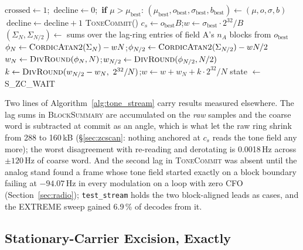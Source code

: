 \begin{algorithm}[H]
\begin{algorithmic}[1]
 
    \State $\mathrm{crossed} \gets 1$;\ $\mathrm{decline} \gets 0$;\ \textbf{if} $\mu > \mu_{\mathrm{best}}$: $(\mu_{\mathrm{best}}, o_{\mathrm{best}}, \sigma_{\mathrm{best}}, b_{\mathrm{best}}) \gets (\mu, o, \sigma, b)$
 $\ \mathrm{decline} \gets \mathrm{decline} + 1$
\EndIf
{}
    \State \textsc{ToneCommit}()
\EndIf
\Statex
{} 
    \State $c_s \gets o_{\mathrm{best}} B$;\quad $w \gets \sigma_{\mathrm{best}} \cdot 2^{32}/B$
    \State $(\Sigma_N, \Sigma_{N/2}) \gets$ sums over the lag-ring entries of field A's $n_A$ blocks from $o_{\mathrm{best}}$
    \State $\phi_N \gets \textsc{CordicAtan2}(\Sigma_N) - wN$;\quad $\phi_{N/2} \gets \textsc{CordicAtan2}(\Sigma_{N/2}) - wN/2$
    \State $w_N \gets \textsc{DivRound}(\phi_N, N)$;\quad $w_{N/2} \gets \textsc{DivRound}(\phi_{N/2}, N/2)$
    \State $k \gets \textsc{DivRound}(w_{N/2} - w_N,\ 2^{32}/N)$;\quad $w \gets w + w_N + k \cdot 2^{32}/N$ 
    \State state $\gets$ S\_ZC\_WAIT 
\EndFunction
\end{algorithmic}
\end{algorithm}

Two lines of Algorithm~\ref{alg:tone_stream} carry results measured
elsewhere.  The lag sums in \textsc{BlockSummary} are accumulated on
the \emph{raw} samples and the coarse word is subtracted at commit as
an angle, which is what let the raw ring shrink from 288 to 160\,kB
(\S\ref{sec:zcscan}: nothing anchored at $c_s$ reads the tone field any
more); the worst disagreement with re-reading and derotating is
0.0018\,Hz across $\pm120$\,Hz of coarse word.  And the second lag in
\textsc{ToneCommit} was absent until the analog stand found a frame
whose tone field started exactly on a block boundary failing at
$-94.07$\,Hz in every modulation on a loop with zero CFO
(Section~\ref{sec:radio}); \texttt{test\_stream} holds the two
block-aligned leads as cases, and the EXTREME sweep gained 6.9\,\% of
decodes from it.

\subsection{Stationary-Carrier Excision, Exactly}
\label{sec:excision}

